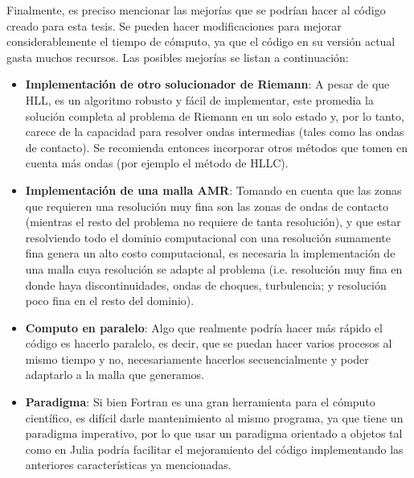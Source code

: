 \documentclass[12pt,a4paper]{book}
\begin{document}
Finalmente, es preciso mencionar las mejorías que se podrían hacer al código creado para esta tesis. Se pueden hacer modificaciones para mejorar considerablemente el tiempo de cómputo, ya que el 
código en su versión actual gasta muchos recursos. Las posibles mejorías se listan a continuación:
\begin{itemize}
    \item \textbf{Implementación de otro solucionador de Riemann}: A pesar de que HLL, es un algoritmo robusto y fácil de implementar, este promedia la solución completa al problema de Riemann en un solo estado y, 
    por lo tanto, carece de la capacidad para resolver ondas intermedias (tales como las ondas de contacto). Se recomienda entonces incorporar otros métodos que tomen en cuenta más ondas (por ejemplo el método de HLLC).
    
    \item \textbf{Implementación de una malla AMR}: Tomando en cuenta que las zonas que requieren una resolución muy fina son las zonas de ondas de contacto (mientras el resto del problema no requiere de tanta resolución), 
    y que estar resolviendo todo el dominio computacional con una resolución sumamente fina genera un alto costo computacional, es necesaria la implementación de una malla cuya resolución se adapte al problema 
    (i.e. resolución muy fina en donde haya discontinuidades, ondas de choques, turbulencia; y resolución poco fina en el resto del dominio). 

    \item \textbf{Computo en paralelo}: Algo que realmente podría hacer más  rápido el código es hacerlo paralelo, es decir, que se puedan hacer varios procesos al mismo tiempo y no, necesariamente hacerlos 
    secuencialmente y poder adaptarlo a la malla que generamos.

    \item \textbf{Paradigma}: Si bien Fortran es una gran herramienta para el cómputo científico, es difícil darle mantenimiento al mismo programa, ya que tiene un paradigma imperativo, por lo que usar un paradigma 
    orientado a objetos tal como en Julia podría facilitar el mejoramiento del código implementando las anteriores características ya mencionadas.
\end{itemize}

\appendix
\end{document}
